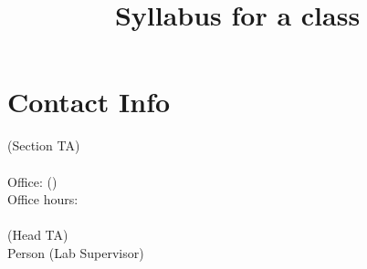 \documentclass[10pt,article,oneside]{memoir}
\title{Syllabus for a class}
\author{\pytem{semester}}
\begin{document}
\maketitle

\noindent
\section*{Contact Info}
 (Section TA)\\
\texttt{}\\
Office:  ()\\
Office hours: \\
\\
 (Head TA)\\
Person (Lab Supervisor)
\end{document}
